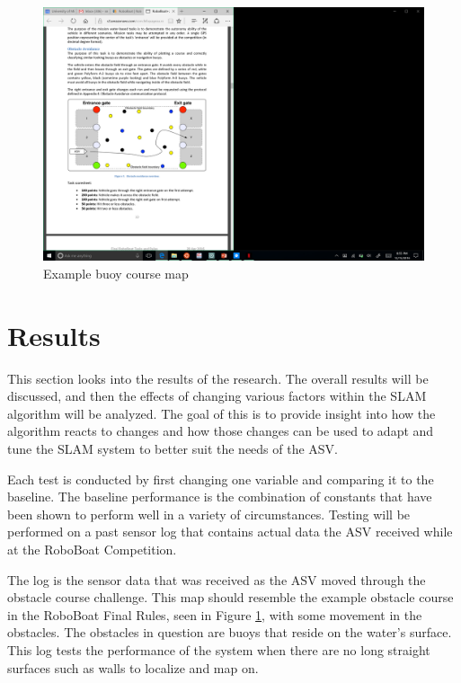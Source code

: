 \documentclass[10pt]{IEEEtran}
\begin{document}
\begin{figure}
	\includegraphics[trim={5cm, 25cm, 55cm, 25cm}, clip, width=\columnwidth]{Figures/roboboatObs}
	\caption{Example buoy course map}
	\label{fig:RoboBoatObs}
\end{figure}

\section{Results}
This section looks into the results of the research.  The overall results will be discussed,
and then the effects of changing various factors within the SLAM algorithm will be 
analyzed.  The goal of this is to provide insight into how the algorithm reacts to changes
and how those changes can be used to adapt and tune the SLAM system to better suit the 
needs of the ASV.  

Each test is conducted by first changing one variable and comparing it to the baseline.
The baseline performance is the combination of constants that have been shown to perform
well in a variety of circumstances.  Testing will be performed on a past sensor log that
contains actual data the ASV received while at the RoboBoat Competition.

The log is the sensor data that was received as the ASV moved through the obstacle course
challenge.  This map 
should resemble the example obstacle course in the RoboBoat Final Rules, seen in 
Figure \ref{fig:RoboBoatObs}, with some movement
in the obstacles.  The obstacles in question are buoys that reside on the water's surface.
This log tests the performance of the system when there are no long straight surfaces such
as walls to localize and map on.
\end{document}
